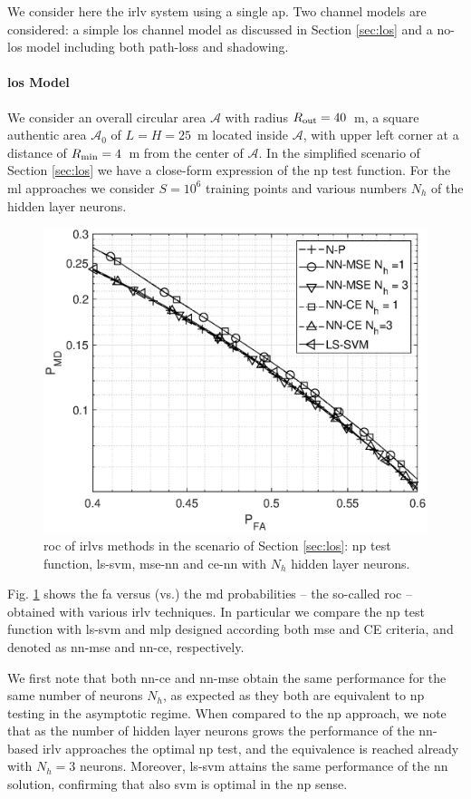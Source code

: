 \documentclass[draftcls,onecolumn,12pt]{IEEEtran}
\begin{document}
We consider here the \ac{irlv} system using a single \ac{ap}. Two channel models are considered: a simple \ac{los} channel model as discussed in Section \ref{sec:los} and a no-\ac{los} model including both path-loss and shadowing.

\paragraph*{\ac{los} Model} We consider an overall circular area $\mathcal{A}$ with radius $R_{\rm out} = 40$~m, a square authentic area $\mathcal{A}_0$ of $L = H= 25$~m located inside $\mathcal{A}$, with upper left corner at a distance of $R_{\rm min} = 4$~m from the center of $\mathcal{A}$. In the simplified scenario of Section \ref{sec:los} we have a close-form expression of the \ac{np} test function. For the \ac{ml} approaches we consider $S=10^6$ training points and various numbers $N_h$ of the hidden layer neurons.

\begin{figure}[h]
    \centering
    \includegraphics[width=0.6\columnwidth]{res_com_CE_MSE_SVM.eps}
    \caption{\ac{roc} of \acp{irlv} methods in the scenario of Section \ref{sec:los}:  \ac{np} test function, \ac{ls}-\ac{svm},  \ac{mse}-\ac{nn} and \ac{ce}-\ac{nn} with $N_h$ hidden layer neurons.}
    \label{fig:ceVSmse}
\end{figure}

Fig. \ref{fig:ceVSmse} shows the \ac{fa} versus (vs.) the \ac{md} probabilities -- the so-called \ac{roc} --  obtained with various \ac{irlv} techniques. In particular we compare the \ac{np} test function with \ac{ls}-\ac{svm} and \ac{mlp} designed according both \ac{mse} and CE criteria, and denoted as \ac{nn}-\ac{mse} and \ac{nn}-\ac{ce}, respectively. 

We first note that both \ac{nn}-\ac{ce} and \ac{nn}-\ac{mse} obtain the same performance for the same number of neurons $N_h$, as expected as they both are equivalent to \ac{np} testing in the asymptotic regime. When compared to the \ac{np} approach,  we note that as the number of hidden layer neurons grows the performance of the \ac{nn}-based \ac{irlv} approaches the optimal \ac{np} test, and the equivalence is reached already with $N_h=3$ neurons. Moreover, \ac{ls}-\ac{svm} attains the same performance of the \ac{nn} solution, confirming that also \ac{svm} is optimal in the \ac{np} sense.
\end{document}
